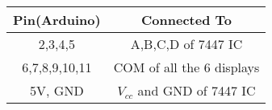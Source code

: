     \begin{tabular}{|c|c|}  %
        \hline
        \textbf{Pin(Arduino)} & \textbf{Connected To} \\  %
        \hline
        2,3,4,5 & A,B,C,D of 7447 IC \\  
        \hline
        6,7,8,9,10,11 & COM of all the 6 displays  \\ 
        \hline
        5V, GND & $V_{cc}$ and GND of 7447 IC  \\  
        \hline
    \end{tabular}
